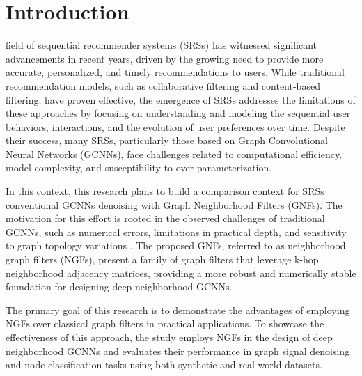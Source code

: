 \documentclass[journal]{IEEEtran}
\begin{document}
% 
% 
% 
% 


\section{Introduction}

 field of sequential recommender systems (SRSs) has witnessed significant advancements 
in recent years, driven by the growing need to provide more accurate, personalized, and timely recommendations 
to users. While traditional recommendation models, such as collaborative filtering and content-based filtering, 
have proven effective, the emergence of SRSs addresses the limitations of these approaches by focusing on 
understanding and modeling the sequential user behaviors, interactions, and the evolution of user preferences 
over time. Despite their success, many SRSs, particularly those based on Graph Convolutional Neural Networks 
(GCNNs), face challenges related to computational efficiency, model complexity, and susceptibility to 
over-parameterization.

In this context, this research plans to build a comparison context for SRSs conventional GCNNs denoising
with Graph Neighborhood Filters (GNFs). The motivation for this effort is rooted in the observed challenges 
of traditional GCNNs, such as numerical errors, limitations in practical depth, and sensitivity to graph 
topology variations \cite{tenorio2021robust}. The proposed GNFs, referred to as neighborhood graph filters (NGFs), present a family 
of graph filters that leverage k-hop neighborhood adjacency matrices, providing a more robust and numerically 
stable foundation for designing deep neighborhood GCNNs.

The primary goal of this research is to demonstrate the advantages of employing NGFs over classical graph filters 
in practical applications. To showcase the effectiveness of this approach, the study employs NGFs in the design 
of deep neighborhood GCNNs and evaluates their performance in graph signal denoising \cite{tenorio2021robust} \cite{FENG2022113} 
and node classification tasks using both synthetic and real-world datasets.
\end{document}

